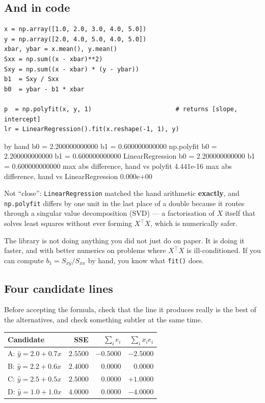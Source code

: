 \documentclass[11pt]{article}
\begin{document}
\subsection{And in code}

\begin{lstlisting}
x = np.array([1.0, 2.0, 3.0, 4.0, 5.0])
y = np.array([2.0, 4.0, 5.0, 4.0, 5.0])
xbar, ybar = x.mean(), y.mean()
Sxx = np.sum((x - xbar)**2)
Sxy = np.sum((x - xbar) * (y - ybar))
b1  = Sxy / Sxx
b0  = ybar - b1 * xbar

p  = np.polyfit(x, y, 1)                       # returns [slope, intercept]
lr = LinearRegression().fit(x.reshape(-1, 1), y)
\end{lstlisting}
\begin{codeout}
by hand          b0 = 2.200000000000   b1 = 0.600000000000
np.polyfit       b0 = 2.200000000000   b1 = 0.600000000000
LinearRegression b0 = 2.200000000000   b1 = 0.600000000000
max abs difference, hand vs polyfit          4.441e-16
max abs difference, hand vs LinearRegression 0.000e+00
\end{codeout}

Not ``close'': \texttt{LinearRegression} matched the hand arithmetic
\textbf{exactly}, and \texttt{np.polyfit} differs by one unit in the last
place of a double because it routes through a singular value decomposition
(SVD) --- a factorisation of $X$ itself that solves least squares without
ever forming $X^{\!\top}\!X$, which is numerically safer.

\begin{keyidea}
The library is not doing anything you did not just do on paper. It is doing it
faster, and with better numerics on problems where $X^{\!\top}\!X$ is
ill-conditioned. If you can compute $b_1 = S_{xy}/S_{xx}$ by hand, you know
what \texttt{fit()} does.
\end{keyidea}

\subsection{Four candidate lines}
\label{sec:candidates}

Before accepting the formula, check that the line it produces really is the
best of the alternatives, and check something subtler at the same time.

\begin{center}\small
\begin{tabular}{@{}lrrr@{}}
  \toprule
  Candidate & SSE & $\sum_i e_i$ & $\sum_i x_ie_i$\\
  \midrule
  A: $\hat y = 2.0 + 0.7x$ & $2.5500$ & $-0.5000$ & $-2.5000$\\
  B: $\hat y = 2.2 + 0.6x$ & $\mathbf{2.4000}$ & $\mathbf{0.0000}$ &
    $\mathbf{0.0000}$\\
  C: $\hat y = 2.5 + 0.5x$ & $2.5000$ & $0.0000$ & $+1.0000$\\
  D: $\hat y = 1.0 + 1.0x$ & $4.0000$ & $0.0000$ & $-4.0000$\\
  \bottomrule
\end{tabular}
\end{center}
\end{document}
